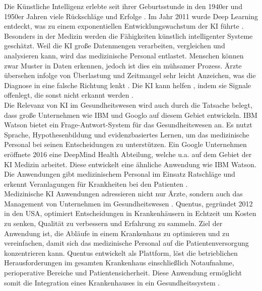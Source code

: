 Die Künstliche Intelligenz erlebte seit ihrer Geburtsstunde in den 1940er und 1950er Jahren viele Rückschläge und Erfolge \cite{Chapter_14}. Im Jahr 2011 wurde Deep Learning entdeckt, was zu einem exponentiellen Entwicklungswachstum der KI führte  \cite{Chapter_14}. 
Besonders in der Medizin werden die Fähigkeiten künstlich intelligenter Systeme geschätzt. Weil die KI große Datenmengen verarbeiten, vergleichen und analysieren kann, wird das medizinische Personal entlastet. Menschen können zwar Muster in Daten erkennen, jedoch ist dies ein mühsamer Prozess. Ärzte übersehen infolge von Überlastung und Zeitmangel sehr leicht Anzeichen, was die Diagnose in eine falsche Richtung lenkt \cite{Opportunities_challenges_ai_hc}. Die KI kann helfen , indem sie Signale offenlegt, die sonst nicht erkannt werden \cite{Opportunities_challenges_ai_hc}.\\

Die Relevanz von KI im Gesundheitswesen wird auch durch die Tatsache belegt, dass große Unternehmen wie IBM und Googlo auf diesem Gebiet entwickeln. IBM Watson bietet ein Frage-Antwort-System für das Gesundheitswesen an. Es nutzt Sprache, Hypothesenbildung und evidenzbasiertes Lernen, um das medizinische Personal bei seinen Entscheidungen zu unterstützen.\cite{Opportunities_challenges_ai_hc} Ein Google Unternehmen eröffnete 2016 eine DeepMind Health Abteilung, welche u.a. auf dem Gebiet der KI Medizin arbeitet. Diese entwickelt eine ähnliche Anwendung wie IBM
Watson. Die Anwendungen gibt medizinischem Personal im Einsatz Ratschläge und erkennt Veranlagungen für Krankheiten bei den Patienten  \cite{Opportunities_challenges_ai_hc}.\\

Medizinische KI Anwendungen adressieren nicht nur Ärzte, sondern auch das Management von Unternehmen im Gesundheitswesen \cite{Opportunities_challenges_ai_hc}. Quentus, gegründet 2012 in den USA, optimiert Entscheidungen in Krankenhäusern in Echtzeit um Kosten zu senken, Qualität zu verbessern und Erfahrung zu sammeln. Ziel der Anwendung ist, die Abläufe in einem Krankenhaus zu optimieren und zu vereinfachen, damit sich das medizinische Personal auf die Patientenversorgung konzentrieren kann. Quentus entwickelt als Plattform, löst die betrieblichen Herausforderungen im gesamten Krankenhaus einschließlich Notaufnahme, perioperative Bereiche und Patientensicherheit. Diese Anwendung ermöglicht somit die Integration eines Krankenhauses in ein Gesundheitssystem \cite{Opportunities_challenges_ai_hc}.\\
 
